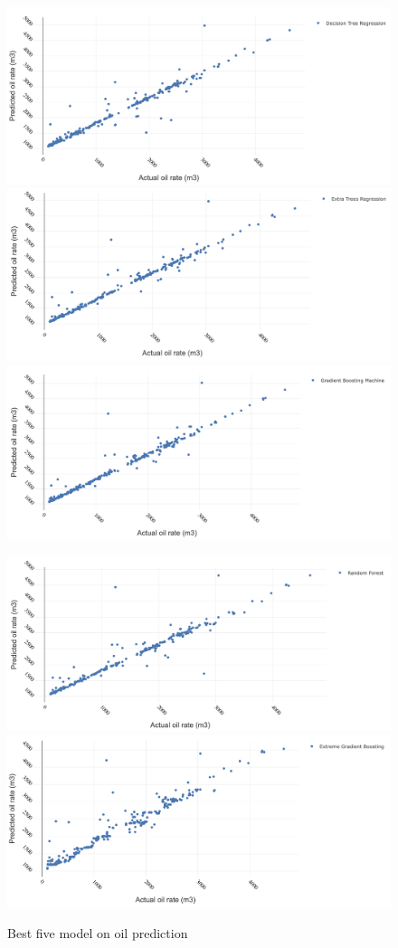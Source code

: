\documentclass[12pt,a4paper]{report}
\begin{document}
\begin{figure}[H]
\centering
\includegraphics[width=.3\textwidth]{5best_oil/DCT}\quad
\includegraphics[width=.3\textwidth]{5best_oil/ETT}\quad
\includegraphics[width=.3\textwidth]{5best_oil/GBM}

\medskip

\includegraphics[width=.3\textwidth]{5best_oil/RF}\quad
\includegraphics[width=.3\textwidth]{5best_oil/XGB}

\caption{Best five  model on oil prediction}
\label{pics:blablabla}
\end{figure}
\end{document}
